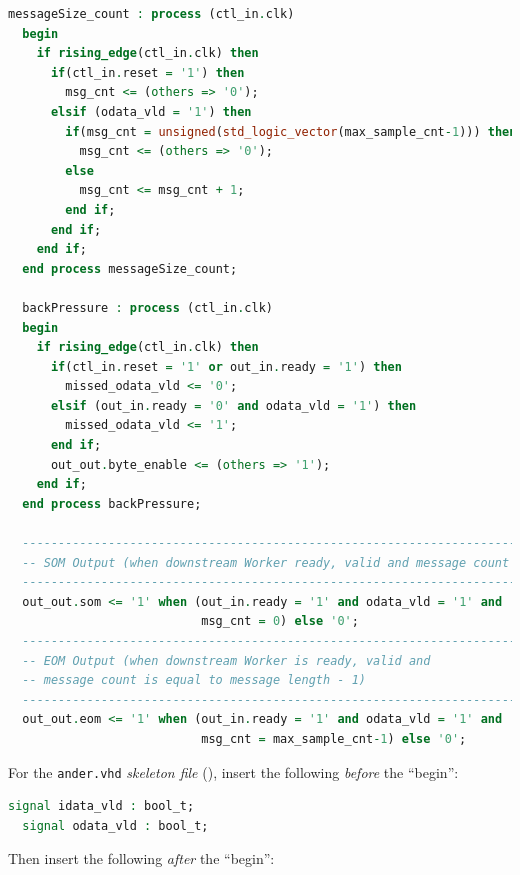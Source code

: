 \begin{lstlisting}[language=vhdl]
  messageSize_count : process (ctl_in.clk)
  begin
    if rising_edge(ctl_in.clk) then
      if(ctl_in.reset = '1') then
        msg_cnt <= (others => '0');
      elsif (odata_vld = '1') then
        if(msg_cnt = unsigned(std_logic_vector(max_sample_cnt-1))) then
          msg_cnt <= (others => '0');
        else
          msg_cnt <= msg_cnt + 1;
        end if;
      end if;
    end if;
  end process messageSize_count;

  backPressure : process (ctl_in.clk)
  begin
    if rising_edge(ctl_in.clk) then
      if(ctl_in.reset = '1' or out_in.ready = '1') then
        missed_odata_vld <= '0';
      elsif (out_in.ready = '0' and odata_vld = '1') then
        missed_odata_vld <= '1';
      end if;
      out_out.byte_enable <= (others => '1');
    end if;
  end process backPressure;

  -----------------------------------------------------------------------------
  -- SOM Output (when downstream Worker ready, valid and message count is zero)
  -----------------------------------------------------------------------------
  out_out.som <= '1' when (out_in.ready = '1' and odata_vld = '1' and
                           msg_cnt = 0) else '0';
  -----------------------------------------------------------------------------
  -- EOM Output (when downstream Worker is ready, valid and
  -- message count is equal to message length - 1)
  -----------------------------------------------------------------------------
  out_out.eom <= '1' when (out_in.ready = '1' and odata_vld = '1' and
                           msg_cnt = max_sample_cnt-1) else '0';
\end{lstlisting}
\bstart
For the \verb+ander.vhd+ \textit{skeleton file}  (), insert the following \textit{before} the ``begin'':
\begin{lstlisting}[language=vhdl]
  signal idata_vld : bool_t;
  signal odata_vld : bool_t;
\end{lstlisting}
\bend
\pagebreak[1]
Then insert the following \textit{after} the ``begin'':
